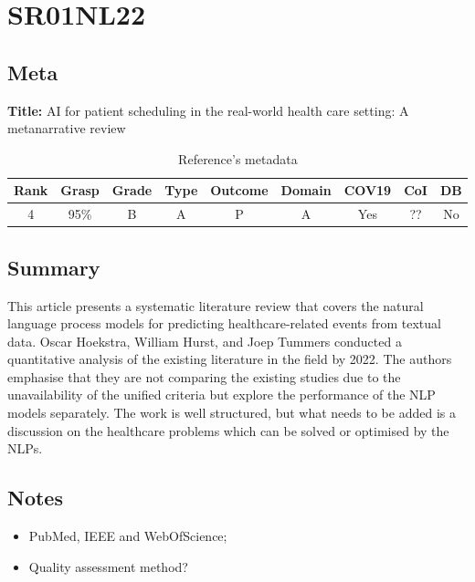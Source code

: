 \section{ SR01NL22 }


\subsection{Meta}

    \textbf{Title:}
    AI for patient scheduling in the real-world health care setting: A metanarrative review

    \begin{table}[H]
        \centering
        \begin{tabular}{|c|c|c|c|c|c|c|c|c|}
            \hline
                \textbf{Rank} & \textbf{Grasp} & \textbf{Grade} & \textbf{Type} & \textbf{Outcome} & \textbf{Domain} & \textbf{COV19} & \textbf{CoI} & \textbf{DB} \\
            \hline
                4 & 95\% & B & A & P & A & Yes & ?? & No \\
            \hline
        \end{tabular}
        \caption{Reference's metadata}
        \label{tab:SR01NL22}
    \end{table}

\subsection{Summary}
This article presents a systematic literature review that covers the natural language process models for predicting healthcare-related events from textual data. Oscar Hoekstra, William Hurst, and Joep Tummers conducted a quantitative analysis of the existing literature in the field by 2022. The authors emphasise that they are not comparing the existing studies due to the unavailability of the unified criteria but explore the performance of the NLP models separately. The work is well structured, but what needs to be added is a discussion on the healthcare problems which can be solved or optimised by the NLPs. 
    

\subsection{Notes}
    \begin{itemize}
        \item PubMed, IEEE and WebOfScience;
        \item Quality assessment method?
    \end{itemize}


